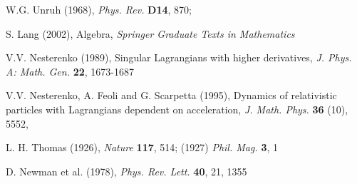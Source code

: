 \documentclass[11pt,a4paper,twoside]{article}
\begin{document}
\begin{thebibliography}{00}
W.G. Unruh
(1968),
\textit{Phys. Rev.}
\textbf{D14},
870;

 S. Lang (2002), Algebra, \textit{Springer Graduate Texts in
Mathematics}

V.V. Nesterenko (1989), Singular Lagrangians with
higher derivatives, \textit{J. Phys. A: Math. Gen.} \textbf{22}, 1673-1687

 {V.V. Nesterenko}, A. Feoli and G. Scarpetta (1995),
Dynamics of relativistic particles with Lagrangians dependent
on acceleration, \textit{J. Math. Phys.} \textbf{36} (10), 5552,

 L. H. Thomas (1926), \textit{Nature} \textbf{117},
514; (1927) \textit{Phil. Mag.} \textbf{3}, 1

 D. Newman et al. (1978), \textit{Phys. Rev. Lett.}
\textbf{40}, 21, 1355
\end{thebibliography}
\end{document}
